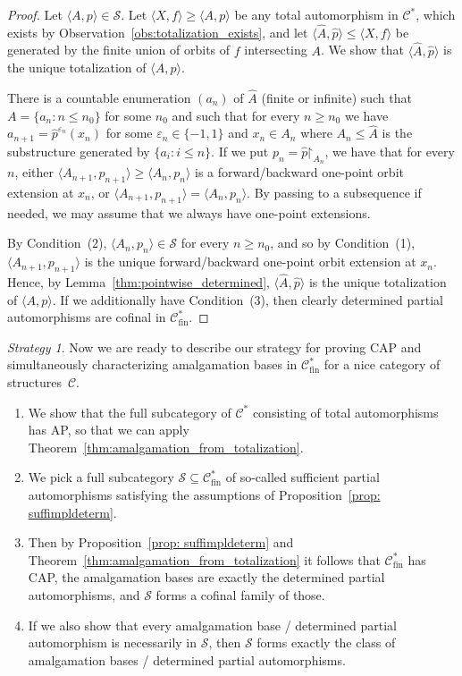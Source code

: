 \documentclass[oneside,notitlepage,12pt]{article}
\theoremstyle{definition}
\theoremstyle{remark}
\newtheorem{strategy}[tw]{Strategy}
\newcommand \set [1]{\{#1\}}
\newcommand \seq [1]{\langle #1 \rangle}
\newcommand \restr [1] {\mathord{\upharpoonright}_{#1}}
\newcommand \eps {\varepsilon}
\newcommand \Su {\mathscr{S}}
\newcommand \C {\mathscr{C}}
\newcommand \fin {{\operatorname{fin}}}
\begin{document}
\begin{proof}
    Let $\seq{A, p} \in \Su$.
    Let $\seq{X, f} \geq \seq{A, p}$ be any total automorphism in $\C^*$, which exists by Observation~\ref{obs:totalization_exists}, and let $\seq{\hat{A}, \hat{p}} \leq \seq{X, f}$ be generated by the finite union of orbits of $f$ intersecting $A$.
    We show that $\seq{\hat{A}, \hat{p}}$ is the unique totalization of $\seq{A, p}$.

    There is a countable enumeration $(a_n)$ of $\hat{A}$ (finite or infinite) such that $A = \set{a_n: n \leq n_0}$ for some $n_0$ and such that for every $n \geq n_0$ we have $a_{n + 1} = \hat{p}^{\eps_n}(x_n)$ for some $\eps_n \in \set{-1, 1}$ and $x_n \in A_n$ where $A_n \leq \hat{A}$ is the substructure generated by $\set{a_i: i \leq n}$.
    If we put $p_n = \hat{p}\restr{A_n}$, we have that for every $n$, either $\seq{A_{n + 1}, p_{n + 1} }\geq \seq{A_n, p_n}$ is a forward/backward one-point orbit extension at $x_n$, or $\seq{A_{n + 1}, p_{n + 1}} = \seq{A_n, p_n}$.
    By passing to a subsequence if needed, we may assume that we always have one-point extensions.
    
    By Condition~(2), $\seq{A_n, p_n} \in \Su$ for every $n \geq n_0$, and so by Condition~(1), $\seq{A_{n + 1}, p_{n + 1}}$ is the unique forward/backward one-point orbit extension at $x_n$.
    Hence, by Lemma~\ref{thm:pointwise_determined}, $\seq{\hat{A}, \hat{p}}$ is the unique totalization of $\seq{A, p}$.
    If we additionally have Condition~(3), then clearly determined partial automorphisms are cofinal in $\C^*_\fin$.
\end{proof}





\begin{strategy} \label{strategy}
Now we are ready to describe our strategy for proving CAP and simultaneously characterizing amalgamation bases in $\C^*_\fin$ for a nice category of structures~$\C$.
\begin{enumerate}
    \item We show that the full subcategory of $\C^*$ consisting of total automorphisms has AP, so that we can apply Theorem~\ref{thm:amalgamation_from_totalization}.
    \item We pick a full subcategory $\Su \subseteq \C^*_\fin$ of so-called sufficient partial automorphisms satisfying the assumptions of Proposition~\ref{prop: suffimpldeterm}.
    \item Then by Proposition~\ref{prop: suffimpldeterm} and Theorem~\ref{thm:amalgamation_from_totalization} it follows that $\C^*_\fin$ has CAP, the amalgamation bases are exactly the determined partial automorphisms, and $\Su$ forms a cofinal family of those.
    \item If we also show that every amalgamation base / determined partial automorphism is necessarily in $\Su$, then $\Su$ forms exactly the class of amalgamation bases / determined partial automorphisms.
\end{enumerate}
\end{strategy}
\end{document}
